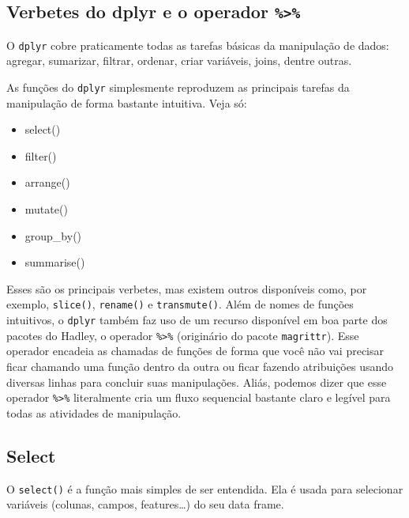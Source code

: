 \documentclass[]{book}
\newenvironment{Shaded}{\begin{snugshade}}{\end{snugshade}}
\newcommand{\KeywordTok}[1]{\textcolor[rgb]{0.13,0.29,0.53}{\textbf{#1}}}
\newcommand{\StringTok}[1]{\textcolor[rgb]{0.31,0.60,0.02}{#1}}
\newcommand{\OperatorTok}[1]{\textcolor[rgb]{0.81,0.36,0.00}{\textbf{#1}}}
\newcommand{\NormalTok}[1]{#1}
\providecommand{\tightlist}{%
  \setlength{\itemsep}{0pt}\setlength{\parskip}{0pt}}
\begin{document}
\subsection{\texorpdfstring{Verbetes do dplyr e o operador
\texttt{\%\textgreater{}\%}}{Verbetes do dplyr e o operador \%\textgreater{}\%}}\label{verbetes-do-dplyr-e-o-operador}

O \texttt{dplyr} cobre praticamente todas as tarefas básicas da
manipulação de dados: agregar, sumarizar, filtrar, ordenar, criar
variáveis, joins, dentre outras.

As funções do \texttt{dplyr} simplesmente reproduzem as principais
tarefas da manipulação de forma bastante intuitiva. Veja só:

\begin{itemize}
\tightlist
\item
  select()
\item
  filter()
\item
  arrange()
\item
  mutate()
\item
  group\_by()
\item
  summarise()
\end{itemize}

Esses são os principais verbetes, mas existem outros disponíveis como,
por exemplo, \texttt{slice()}, \texttt{rename()} e \texttt{transmute()}.
Além de nomes de funções intuitivos, o \texttt{dplyr} também faz uso de
um recurso disponível em boa parte dos pacotes do Hadley, o operador
\texttt{\%\textgreater{}\%} (originário do pacote \texttt{magrittr}).
Esse operador encadeia as chamadas de funções de forma que você não vai
precisar ficar chamando uma função dentro da outra ou ficar fazendo
atribuições usando diversas linhas para concluir suas manipulações.
Aliás, podemos dizer que esse operador \texttt{\%\textgreater{}\%}
literalmente cria um fluxo sequencial bastante claro e legível para
todas as atividades de manipulação.

\subsection{Select}\label{select}

O \texttt{select()} é a função mais simples de ser entendida. Ela é
usada para selecionar variáveis (colunas, campos, features\ldots{}) do
seu data frame.

\begin{Shaded}
\end{Shaded}
\end{document}
